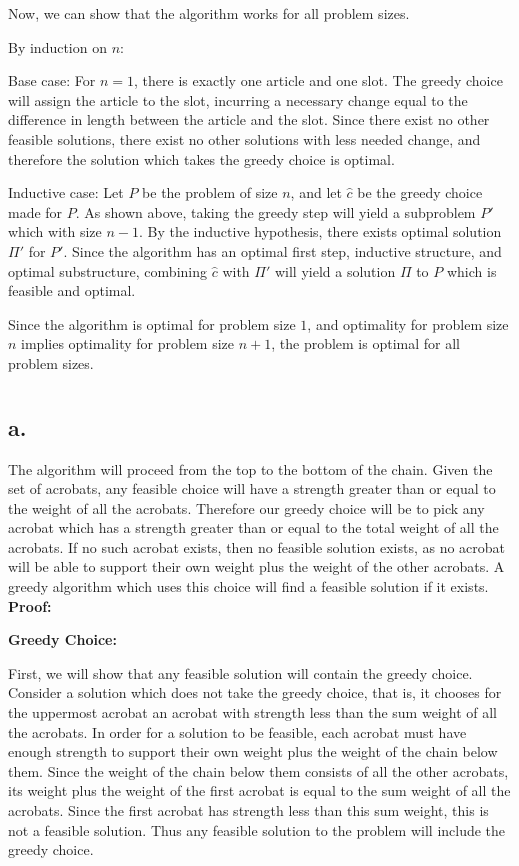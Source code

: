 \documentclass[11pt]{article}
\begin{document}
Now, we can show that the algorithm works for all problem sizes.

By induction on $n$:  

Base case: For $n=1$, there is exactly one article and one slot. The greedy choice will assign the article to the slot, incurring a necessary change equal to the difference in length between the article and the slot. Since there exist no other feasible solutions, there exist no other solutions with less needed change, and therefore the solution which takes the greedy choice is optimal. 

Inductive case: Let $P$ be the problem of size $n$, and let $\hat{c}$ be the greedy choice made for $P$. As shown above, taking the greedy step will yield a subproblem $P'$ which with size $n-1$. By the inductive hypothesis, there exists optimal solution $\Pi'$ for $P'$. Since the algorithm has an optimal first step, inductive structure, and optimal substructure, combining $\hat{c}$ with $\Pi'$ will yield a solution $\Pi$ to $P$ which is feasible and optimal. 

Since the algorithm is optimal for problem size $1$, and optimality for problem size $n$ implies optimality for problem size $n+1$, the problem is optimal for all problem sizes. \\ 


\section{}
\subsection*{a.}
The algorithm will proceed from the top to the bottom of the chain. Given the set of acrobats, any feasible choice will have a strength greater than or equal to the weight of all the acrobats. Therefore our greedy choice will be to pick any acrobat which has a strength greater than or equal to the total weight of all the acrobats. If no such acrobat exists, then no feasible solution exists, as no acrobat will be able to support their own weight plus the weight of the other acrobats. A greedy algorithm which uses this choice will find a feasible solution if it exists. \\ 

\textbf{Proof: }

\textbf{Greedy Choice: }

First, we will show that any feasible solution will contain the greedy choice. Consider a solution which does not take the greedy choice, that is, it chooses for the uppermost acrobat an acrobat with strength less than the sum weight of all the acrobats. In order for a solution to be feasible, each acrobat must have enough strength to support their own weight plus the weight of the chain below them. Since the weight of the chain below them consists of all the other acrobats, its weight plus the weight of the first acrobat is equal to the sum weight of all the acrobats. Since the first acrobat has strength less than this sum weight, this is not a feasible solution. Thus any feasible solution to the problem will include the greedy choice. 
\end{document}
